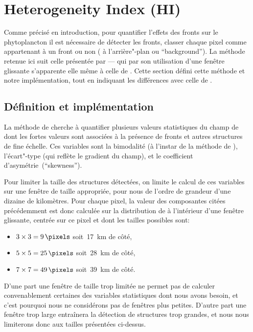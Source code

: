 \section{Heterogeneity Index (HI)}
\label{sec:HI}

Comme précisé en introduction, pour quantifier l'effets des fronts sur le phytoplancton il est nécessaire de détecter les fronts,  classer chaque pixel comme appartenant à un front ou non ( à l'arrière"-plan ou \enquote{background}).
La méthode retenue ici suit celle présentée par \textcite{liu_2016} --- qui par son utilisation d'une fenêtre glissante s'apparente elle même à celle de \textcite{cayula_1992}.
Cette section défini cette méthode et notre implémentation, tout en indiquant les différences avec celle de \textcite{liu_2016}.

\subsection{Définition et implémentation}
\label{sec:HI-definition}

La méthode de \textcite{liu_2016} cherche à quantifier plusieurs valeurs statistiques du champ de  dont les fortes valeurs sont associées à la présence de fronts et autres structures de fine échelle.
Ces variables sont la bimodalité (à l'instar de la méthode de \textcite{cayula_1992}), l'écart"-type (qui reflète le gradient du champ), et le coefficient d'asymétrie~(\enquote{skewness}).

Pour limiter la taille des structures détectées, on limite le calcul de ces variables sur une fenêtre de taille appropriée,  pour nous de l'ordre de grandeur d'une dizaine de kilomètres.
Pour chaque pixel, la valeur des composantes citées précédemment est donc calculée sur la distribution de  à l'intérieur d'une fenêtre glissante, centrée sur ce pixel et dont les tailles possibles sont:
\begin{itemize}
        \item \(3 \times 3 =\qty{9}{\pixels}\) soit~\qty{17}{\km} de côté,
        \item \(5 \times 5 =\qty{25}{\pixels}\) soit~\qty{28}{\km} de côté,
        \item \(7 \times 7 =\qty{49}{\pixels}\) soit~\qty{39}{\km} de côté.
\end{itemize}
D'une part une fenêtre de taille trop limitée ne permet pas de calculer convenablement certaines des variables statistiques dont nous avons besoin, et c'est pourquoi nous ne considérons pas de fenêtres plus petites.
D'autre part une fenêtre trop large entraînera la détection de structures trop grandes, et nous nous limiterons donc aux tailles présentées ci-dessus.

